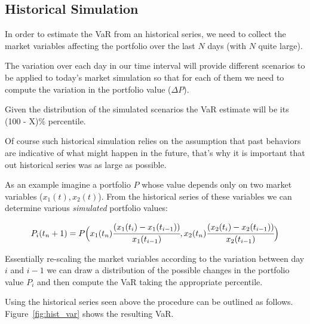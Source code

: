 \subsection{Historical Simulation}\label{historical-simulation}

In order to estimate the VaR from an historical series, we need to
collect the market variables affecting the portfolio over the last \(N\)
days (with \(N\) quite large).

The variation over each day in our time interval will provide different
scenarios to be applied to today's market simulation so that for each of
them we need to compute the variation in the portfolio value
(\(\Delta P\)). 

Given the distribution of the simulated scenarios the VaR estimate 
will be its (100 - X)\% percentile. 

Of course such historical simulation relies on the assumption that past
behaviors are indicative of what might happen in the future, that's why it 
is important that out historical series was as large as possible.

As an example imagine a portfolio \(P\) whose value depends only on two market
variables (\(x_1(t) , x_2(t)\)). From the historical series of these
variables we can determine various \emph{simulated} portfolio
values:

\[P_i(t_n+1) = P\Big(x_1(t_n)\cfrac{(x_1(t_i)-x_1(t_{i-1}))}{x_1(t_{i-1})}, x_2(t_n)\cfrac{(x_2(t_i)-x_2(t_{i-1}))}{x_2(t_{i-1})}\Big)\]

Essentially re-scaling the market variables according to the variation
between day \(i\) and \(i-1\) we can draw a distribution of the possible
changes in the portfolio value \(P_i\) and then compute the VaR taking
the appropriate percentile.

Using the historical series seen above the procedure can be outlined as follows. Figure~\ref{fig:hist_var} shows the resulting VaR.

